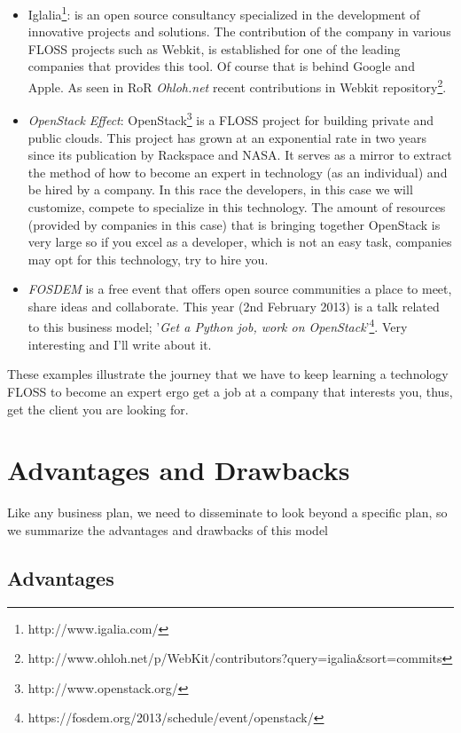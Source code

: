 \documentclass[11pt]{scrartcl}
\begin{document}
\begin{itemize}
    \item Iglalia\footnote{http://www.igalia.com/}: is an open source consultancy specialized in the development of innovative projects and solutions. The contribution of the company in various FLOSS projects such as Webkit, is established for one of the leading companies that provides this tool. Of course that is behind Google and Apple. As seen in RoR \emph{Ohloh.net} recent contributions in Webkit repository\footnote {http://www.ohloh.net/p/WebKit/contributors?query=igalia\&sort=commits}.
    \item \emph{OpenStack Effect}: OpenStack\footnote{http://www.openstack.org/} is a FLOSS project for building private and public clouds. This project has grown at an exponential rate in two years since its publication by Rackspace and NASA. It serves as a mirror to extract the method of how to become an expert in technology (as an individual) and be hired by a company. In this race the developers, in this case we will customize, compete to specialize in this technology. The amount of resources (provided by companies in this case) that is bringing together OpenStack is very large so if you excel as a developer, which is not an easy task, companies may opt for this technology, try to hire you.
    \item \emph{FOSDEM} is a free event that offers open source communities a place to meet, share ideas and collaborate. This year (2nd February 2013) is a talk related to this business model; '\emph{Get a Python job, work on OpenStack}'\footnote{https://fosdem.org/2013/schedule/event/openstack/}. Very interesting and I'll write about it.
\end{itemize}

\par These examples illustrate the journey that we have to keep learning a technology FLOSS to become an expert ergo get a job at a company that interests you, thus, get the client you are looking for.

\section{Advantages and Drawbacks}

\par Like any business plan, we need to disseminate to look beyond a specific plan, so we summarize the advantages and drawbacks of this model

\subsection{Advantages}
\end{document}
